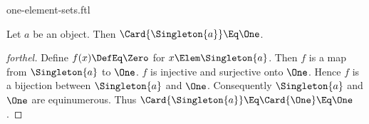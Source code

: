 \documentclass{stex}
\begin{document}
\begin{smodule}{one-element-sets.ftl}


\begin{proposition*}[forthel]
  Let $a$ be an object.
  Then $\Card{\Singleton{a}} \Eq \One$.
\end{proposition*}
\begin{proof}[forthel]
  Define $f(x) \DefEq \Zero$ for $x \Elem \Singleton{a}$.
  Then $f$ is a map from $\Singleton{a}$ to $\One$.
  $f$ is injective and surjective onto $\One$.
  Hence $f$ is a bijection between $\Singleton{a}$ and $\One$.
  Consequently $\Singleton{a}$ and $\One$ are equinumerous.
  Thus $\Card{\Singleton{a}} \Eq \Card{\One} \Eq \One$.
\end{proof}

\end{smodule}
\end{document}
